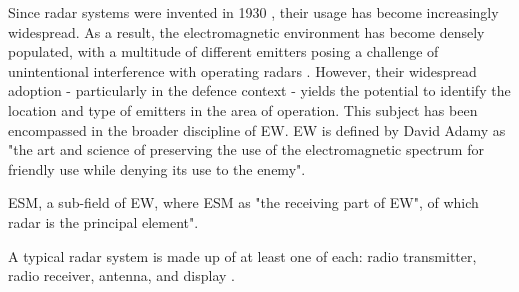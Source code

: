 Since radar systems were invented in 1930 \cite{degering_invention_2018}, their usage has become increasingly widespread. As a result, the electromagnetic environment has become densely populated, with a multitude of different emitters posing a challenge of unintentional interference with operating radars \cite{degering_invention_2018}. However, their widespread adoption - particularly in the defence context - yields the potential to identify the location and type of emitters in the area of operation.
This subject has been encompassed in the broader discipline of \ac{EW}. \ac{EW} is defined by David Adamy \cite{adamy_13_2001} as "the art and science of preserving the use of the electromagnetic spectrum for friendly use while denying its use to the enemy".

\ac{ESM}, a sub-field of \ac{EW}, where \ac{ESM} as "the receiving part of EW"\cite{adamy_13_2001}, of which radar is the principal element".



A typical radar system is made up of at least one of each: radio transmitter, radio receiver, antenna, and display \cite{stimson_introduction_1998}. %






